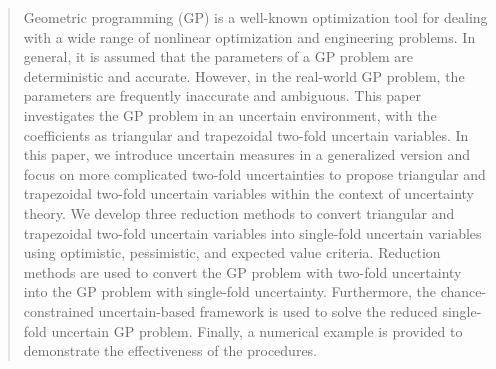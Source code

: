 
\author{Tapas Mondal         \and
        Akshay Kumar Ojha  \and Sabyasachi Pani%
}


\author{Tapas Mondal* \and Akshay Kumar Ojha \and Sabyasachi Pani }

\date{Received: date / Accepted: date}


\maketitle

\begin{abstract}
Geometric programming (GP) is a well-known optimization tool for dealing with a wide range of nonlinear optimization and engineering problems. In general, it is assumed that the parameters of a GP problem are deterministic and accurate. However, in the real-world GP problem, the parameters are frequently inaccurate and ambiguous. This paper investigates the GP problem in an uncertain environment, with the coefficients as triangular and trapezoidal two-fold uncertain variables. In this paper, we introduce uncertain measures in a generalized version and focus on more complicated two-fold uncertainties to propose triangular and trapezoidal two-fold uncertain variables within the context of uncertainty theory. We develop three reduction methods to convert triangular and trapezoidal two-fold uncertain variables into single-fold uncertain variables using optimistic, pessimistic, and expected value criteria. Reduction methods are used to convert the GP problem with two-fold uncertainty into the GP problem with single-fold uncertainty. Furthermore, the chance-constrained uncertain-based framework is used to solve the reduced single-fold uncertain GP problem. Finally, a numerical example is provided to demonstrate the effectiveness of the procedures.\\
\end{abstract}
